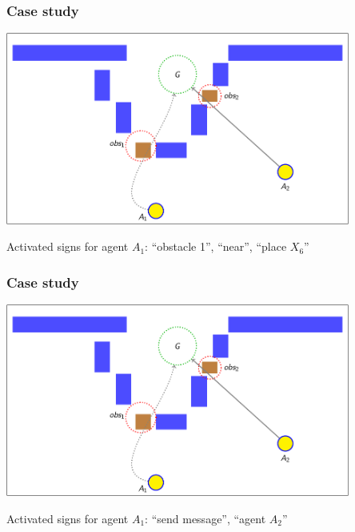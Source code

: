\documentclass[default]{beamer}
\begin{document}
	\begin{frame}
		\frametitle{Case study}
		
		\begin{center}
			\includegraphics[page=31,width=0.85\textwidth]{slides_colored}
		\end{center}
		\par\bigskip
		Activated signs for agent $A_1$: ``obstacle 1'', ``near'', ``place $X_6$''
	\end{frame}

	\begin{frame}
		\frametitle{Case study}
		
		\begin{center}
			\includegraphics[page=42,width=0.85\textwidth]{slides_colored}
		\end{center}
		\par\bigskip
		Activated signs for agent $A_1$: ``send message'', ``agent $A_2$''
	\end{frame}
\end{document}
